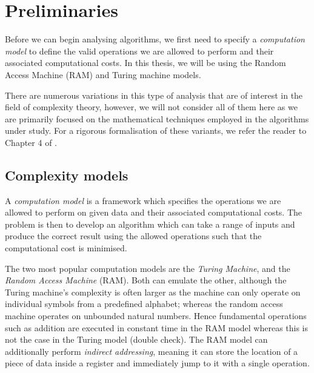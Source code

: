 \chapter{Preliminaries}\label{chp:preliminaries}

Before we can begin analysing algorithms, we first need to specify a \emph{computation model} to define the valid operations we are allowed to perform and their associated computational costs. In this thesis, we will be using the Random Access Machine (RAM) and Turing machine models.

There are numerous variations in this type of analysis that are of interest in the field of complexity theory, however, we will not consider all of them here as we are primarily focused on the mathematical techniques employed in the algorithms under study. For a rigorous formalisation of these variants, we refer the reader to Chapter 4 of \cite{burgisser}.

\section{Complexity models}%
\label{sec:Complexity models}

A \textit{computation model} is a framework which specifies the operations we are allowed to perform on given data and their associated computational costs. The problem is then to develop an algorithm which can take a range of inputs and produce the correct result using the allowed operations such that the computational cost is minimised.

The two most popular computation models are the \textit{Turing Machine}, and the \textit{Random Access Machine} (RAM). Both can emulate the other, although the Turing machine's complexity is often larger as the machine can only operate on individual symbols from a predefined alphabet; whereas the random access machine operates on unbounded natural numbers. Hence fundamental operations such as addition are executed in constant time in the RAM model whereas this is not the case in the Turing model (double check). The RAM model can additionally perform \emph{indirect addressing}, meaning it can store the location of a piece of data inside a register and immediately jump to it with a single operation.


